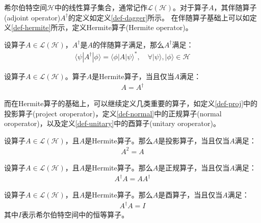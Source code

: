 希尔伯特空间\(\mathcal{H}\)中的线性算子集合，通常记作\(\mathcal{L} (\mathcal{H})\)。对于算子$A$，其伴随算子(adjoint operator)$A^\dagger$的定义如定义\ref{def-dagger}所示。
在伴随算子基础上可以如定义\ref{def-hermite}所示，定义Hermite算子(Hermite operator)。
\begin{definition}\citep{nielsen2010quantum}
    \label{def-dagger}
    设算子\(A \in \mathcal{L}(\mathcal{H})\)，\(A^\dagger\)是$A$的伴随算子满足，那么\(A^\dagger\)满足：
\begin{align}
    \langle \psi |A^\dagger|\phi \rangle = \langle \phi |A|\psi \rangle^*,\quad \forall |\psi \rangle, |\phi \rangle\in \mathcal{H}
\end{align}
\end{definition}
\begin{definition}\citep{nielsen2010quantum}
    \label{def-hermite}
    设算子\(A \in \mathcal{L}(\mathcal{H})\)。算子\(A\)是Hermite算子，当且仅当\(A\)满足：
\begin{align}
    A = A^\dagger
\end{align}
\end{definition}


而在Hermite算子的基础上，可以继续定义几类重要的算子，如定义\ref{def-proj}中的投影算子(project oroperator)，定义\ref{def-normal}中的正规算子(normal oroperator)，以及定义\ref{def-unitary}中的酉算子(unitary oroperator)。
\begin{definition}\citep{nielsen2010quantum}
    \label{def-proj}
    设算子\(A \in \mathcal{L}(\mathcal{H})\)，且\(A\)是Hermite算子。那么\(A\)是投影算子，当且仅当\(A\)满足：
\begin{align}
    A^2 = A
\end{align}
\end{definition}

\begin{definition}\citep{nielsen2010quantum}
    \label{def-normal}
    设算子\(A \in \mathcal{L}(\mathcal{H})\)，且\(A\)是Hermite算子。那么\(A\)是正规算子，当且仅当\(A\)满足：
\begin{align}
    A^\dagger A = A A^\dagger
\end{align}
\end{definition}

\begin{definition}\citep{nielsen2010quantum}
    \label{def-unitary}
    设算子\(A \in \mathcal{L}(\mathcal{H})\)，且\(A\)是Hermite算子。那么\(A\)是酉算子，当且仅当\(A\)满足：
\begin{align}
    A^\dagger A = I
\end{align}
其中$I$表示希尔伯特空间中的恒等算子。
\end{definition}

